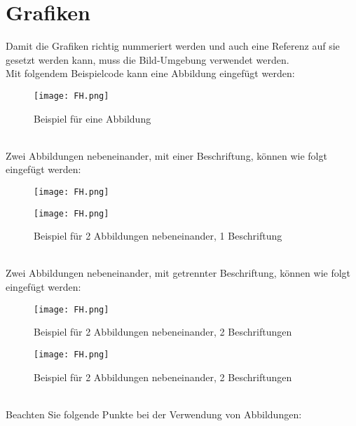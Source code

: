 \section{Grafiken}
\label{sec: Grafik}
Damit die Grafiken richtig nummeriert werden und auch eine Referenz auf sie gesetzt werden kann, muss die Bild-Umgebung verwendet werden.\\
Mit folgendem Beispielcode kann eine Abbildung eingefügt werden:
\begin{figure}[h]
	\centering
	\texttt{[image: FH.png]}
	\caption{Beispiel für eine Abbildung}
	\label{fig: Beispielabbildung}
\end{figure}\\
Zwei Abbildungen nebeneinander, mit einer Beschriftung, können wie folgt eingefügt werden:
\begin{figure}[htp!]
	\begin{minipage}[t]{0.49\textwidth}
		\centering
		\texttt{[image: FH.png]}
	\end{minipage}
	\hfill
	\begin{minipage}[t]{0.49\textwidth}
		\centering
		\texttt{[image: FH.png]}
	\end{minipage}
	\caption{Beispiel für 2 Abbildungen nebeneinander, 1 Beschriftung}
	\label{fig: Beispielabbildung-2}
\end{figure}\\
Zwei Abbildungen nebeneinander, mit getrennter Beschriftung, können wie folgt eingefügt werden:
\begin{figure}[htp!]
	\begin{minipage}[t]{0.49\textwidth}
		\centering
		\texttt{[image: FH.png]}
		\caption{Beispiel für 2 Abbildungen nebeneinander, 2 Beschriftungen}
		\label{fig: Beispielabbildung-3}
	\end{minipage}
	\hfill
	\begin{minipage}[t]{0.49\textwidth}
		\centering
		\texttt{[image: FH.png]}
		\caption{Beispiel für 2 Abbildungen nebeneinander, 2 Beschriftungen}
		\label{fig: Beispielabbildung-4}
	\end{minipage}
\end{figure}\\
Beachten Sie folgende Punkte bei der Verwendung von Abbildungen:
